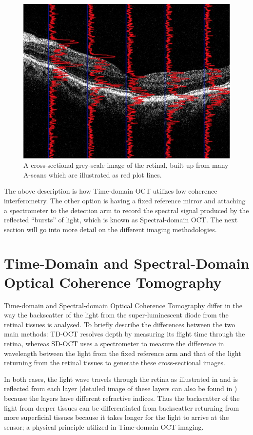 \begin{figure}[htbp]
\centering
\includegraphics{figures/morgan_3}
\caption{A cross-sectional grey-scale image of the retinal, built up from many A-scans which are illustrated as red plot lines. \cite{mbib_6} }
\label{fig:m_3}
\end{figure}


The above description is how Time-domain OCT utilizes low coherence interferometry.
The other option is having a fixed reference mirror and attaching a spectrometer to
the detection arm to record the spectral signal produced by the reflected
 “bursts” of light, which is known as Spectral-domain OCT.\cite{mbib_3} The next
section will go into more detail on the different imaging methodologies.

\section{Time-Domain and Spectral-Domain Optical Coherence Tomography}
Time-domain and Spectral-domain Optical Coherence Tomography differ in the way
the backscatter of the light from the super-luminescent diode from the retinal
tissues is analysed.  To briefly describe the differences between the two main
methods: TD-OCT resolves depth by measuring its flight time through the retina,
whereas SD-OCT uses a spectrometer to measure the difference in wavelength
between the light from the fixed reference arm and that of the light returning
from the retinal tissues to generate these cross-sectional images.\cite{mbib_7}

In both cases, the light wave travels through the retina as illustrated in  and
is reflected from each layer (detailed image of these layers can also be
found in  ) because the layers have different refractive indices.
Thus the backscatter of the light from deeper tissues can be differentiated from
backscatter returning from more superficial tissues because it takes longer for
the light to arrive at the sensor; a physical principle utilized in Time-domain OCT
imaging.\cite{mbib_4}

